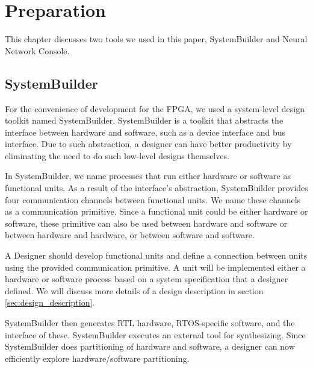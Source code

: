 
\chapter{Preparation}

This chapter discusses two tools we used in this paper, SystemBuilder and Neural Network Console.

\section{SystemBuilder}\label{sec:SystemBuilder}

For the convenience of development for the FPGA, we used a system-level design toolkit named SystemBuilder. SystemBuilder is a toolkit that abstracts the interface between hardware and software, such as a device interface and bus interface. Due to such abstraction, a designer can have better productivity by eliminating the need to do such low-level designs themselves.

In SystemBuilder, we name processes that run either hardware or software as functional units. As a result of the interface's abstraction, SystemBuilder provides four communication channels between functional units. We name these channels as a communication primitive. Since a functional unit could be either hardware or software, these primitive can also be used between hardware and software or between hardware and hardware, or between software and software.

A Designer should develop functional units and define a connection between units using the provided communication primitive. A unit will be implemented either a hardware or software process based on a system specification that a designer defined. We will discuss more details of a design description in section \ref{sec:design_description}.

SystemBuilder then generates RTL hardware, RTOS-specific software, and the interface of these. SystemBuilder executes an external tool for synthesizing. Since SystemBuilder does partitioning of hardware and software, a designer can now efficiently explore hardware/software partitioning.

